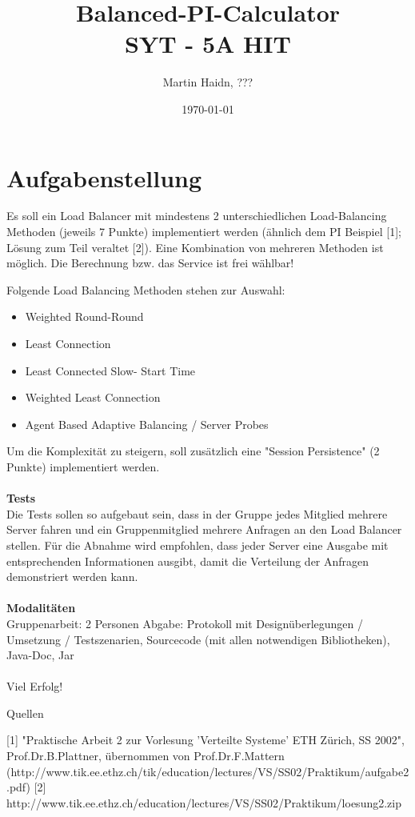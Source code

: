 \documentclass[12p]{article}
\author{Martin Haidn, ???}
\title{\Huge{Balanced-PI-Calculator}\\\Large{SYT - 5A HIT}}
\date{\today}
\begin{document}
	\maketitle
	
	\newpage
	\tableofcontents
	
	\newpage
	\section{Aufgabenstellung}
	Es soll ein Load Balancer mit mindestens 2 unterschiedlichen Load-Balancing Methoden (jeweils 7 Punkte) implementiert werden (ähnlich dem PI Beispiel [1]; Lösung zum Teil veraltet [2]). Eine Kombination von mehreren Methoden ist möglich. Die Berechnung bzw. das Service ist frei wählbar!
	
	Folgende Load Balancing Methoden stehen zur Auswahl:
	
	\begin{itemize}
		\item Weighted Round-Round
		\item Least Connection
		\item Least Connected Slow- Start Time
		\item Weighted Least Connection
		\item Agent Based Adaptive Balancing / Server Probes
		\\
	\end{itemize}
	Um die Komplexität zu steigern, soll zusätzlich eine "Session Persistence" (2 Punkte) implementiert werden.\\
	\\
	\textbf{Tests}\\
	Die Tests sollen so aufgebaut sein, dass in der Gruppe jedes Mitglied mehrere Server fahren und ein Gruppenmitglied mehrere Anfragen an den Load Balancer stellen. Für die Abnahme wird empfohlen, dass jeder Server eine Ausgabe mit entsprechenden Informationen ausgibt, damit die Verteilung der Anfragen demonstriert werden kann.\\\\
	\textbf{Modalitäten}\\
	Gruppenarbeit: 2 Personen
	Abgabe: Protokoll mit Designüberlegungen / Umsetzung / Testszenarien, Sourcecode (mit allen notwendigen Bibliotheken), Java-Doc, Jar\\
	\\
	Viel Erfolg!
	
	Quellen
	
	[1] "Praktische Arbeit 2 zur Vorlesung 'Verteilte Systeme' ETH Zürich, SS 2002", Prof.Dr.B.Plattner, übernommen von Prof.Dr.F.Mattern (http://www.tik.ee.ethz.ch/tik/education/lectures/VS/SS02/Praktikum/aufgabe2.pdf)
	[2] http://www.tik.ee.ethz.ch/education/lectures/VS/SS02/Praktikum/loesung2.zip
	
	
	\newpage
	\listoffigures
	\printglossaries
	
	\newpage
	
	
	
\end{document}
